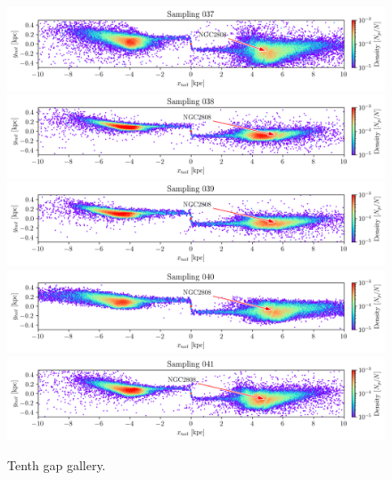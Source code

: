 \documentclass{aa}
\begin{document}
\begin{appendix}
    \begin{figure}
      \centering
      \includegraphics[width=\linewidth]{gallery_of_gaps_monte-carlo-037.png}
      \includegraphics[width=\linewidth]{gallery_of_gaps_monte-carlo-038.png}
      \includegraphics[width=\linewidth]{gallery_of_gaps_monte-carlo-039.png}
      \includegraphics[width=\linewidth]{gallery_of_gaps_monte-carlo-040.png}
      \includegraphics[width=\linewidth]{gallery_of_gaps_monte-carlo-041.png}      
      \caption{Tenth gap gallery.}
      \label{fig:gallery9}
    \end{figure}        
    

\end{appendix}
\end{document}
